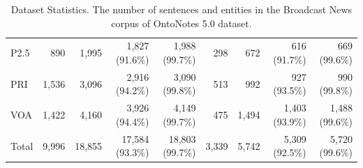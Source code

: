 \begin{table}[h]
{\begin{tabular}{lrrrrrrrr}
		P2.5                   & 890                          & 1,995                          & 1,827 (91.6\%)               & 1,988 (99.7\%)                 	& 298                          & 672                           & 616 (91.7\%)               & 669 (99.6\%)                \\
		PRI                   & 1,536                        & 3,096                         & 2,916 (94.2\%)               & 3,090 (99.8\%)                 	& 513                          & 992                           & 927 (93.5\%)               & 990 (99.8\%)                \\
		VOA                   & 1,422                        & 4,160                         & 3,926 (94.4\%)               & 4,149 (99.7\%)                 	& 475                          & 1,494                         & 1,403 (93.9\%)               & 1,488 (99.6\%)               \\	
		Total                   & 9,996                        & 18,855                         & 17,584 (93.3\%)               & 18,803 (99.7\%)                 & 3,339                          & 5,742                         & 5,309 (92.5\%)               & 5,720 (99.6\%)               \\
		\bottomrule
	\end{tabular}
}
	\caption{Dataset Statistics. The number of sentences and entities in the Broadcast News corpus of OntoNotes 5.0 dataset. }
	\label{tab:detailedstatistics}
\end{table}
